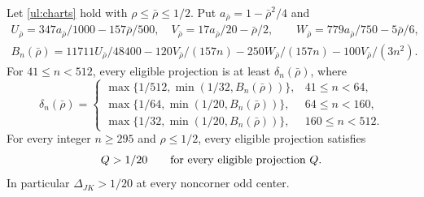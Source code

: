 \begin{lemma}\label{ul:selected-pairs}
Let \eqref{ul:charts} hold with $\rho\leq\bar\rho\leq1/2$.
Put $a_{\bar\rho}=1-\bar\rho^2/4$ and
\begin{gather*}
 U_{\bar\rho}=347a_{\bar\rho}/1000-157\bar\rho/500,
 \quad V_{\bar\rho}=17a_{\bar\rho}/20-\bar\rho/2,\qquad
 W_{\bar\rho}=779a_{\bar\rho}/750-5\bar\rho/6,\\
 B_n(\bar\rho)=11711U_{\bar\rho}/48400-120V_{\bar\rho}/(157n)
             -250W_{\bar\rho}/(157n)-100V_{\bar\rho}/(3n^2).
\end{gather*}
For $41\leq n<512$, every eligible projection is at least
$\delta_n(\bar\rho)$, where
\begin{equation}\label{ul:finite-floors}
 \delta_n(\bar\rho)=
 \begin{cases}
 \max\{1/512,\min(1/32,B_n(\bar\rho))\},&41\leq n<64,\\
 \max\{1/64,\min(1/20,B_n(\bar\rho))\},&64\leq n<160,\\
 \max\{1/32,\min(1/20,B_n(\bar\rho))\},&160\leq n<512.
 \end{cases}
\end{equation}
For every integer $n\geq295$ and $\rho\leq1/2$, every eligible
projection satisfies
\begin{equation}\label{ul:uniform-floor}
 Q>1/20\qquad\hbox{for every eligible projection }Q.
\end{equation}
In particular $\Delta_{JK}>1/20$ at every noncorner odd center.
\end{lemma}

